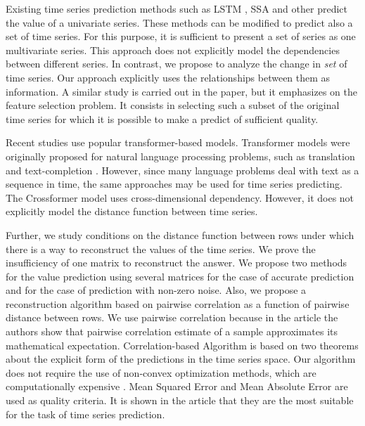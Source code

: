 \documentclass[12pt]{article}
\begin{document}
	Existing time series prediction methods such as LSTM \cite{LSTM}, SSA \cite{SSA} and other \cite{Biosignals, boyd2017multiperiod} predict the value of a univariate series. These methods can be modified to predict also a set of time series. For this purpose, it is sufficient to present a set of series as one multivariate series. This approach does not explicitly model the dependencies between different series. In contrast, we propose to analyze the change in \emph{set} of time series. Our approach explicitly uses the relationships between them as information. A similar study is carried out in the \cite{MulticorrelatedQuadratic} paper, but it emphasizes on the feature selection problem. It consists in selecting such a subset of the original time series for which it is possible to make a predict of sufficient quality.
	
	Recent studies \cite{haoyietal-informer-2021,haoyietal-informerEx-2023,wu2021autoformer,liu2022pyraformer} use popular transformer-based models. Transformer models were originally proposed for natural language processing problems, such as translation and text-completion \cite{NIPS2017_3f5ee243}. However, since many language problems deal with text as a sequence in time, the same approaches may be used for time series predicting. The Crossformer model \cite{zhang2023crossformer} uses cross-dimensional dependency.  However, it does not explicitly model the distance function between time series.
	
	Further, we study conditions on the distance function between rows under which there is a way to reconstruct the values of the time series. We prove the insufficiency of one matrix to reconstruct the answer. We propose two methods for the value prediction using several matrices for the case of accurate prediction and for the case of prediction with non-zero noise. Also, we propose a reconstruction algorithm based on pairwise correlation as a function of pairwise distance between rows. We use pairwise correlation because in the article \cite{puchkin2023sharper} the authors show that pairwise correlation estimate of a sample approximates its mathematical expectation. Correlation-based Algorithm is based on two theorems about the explicit form of the predictions in the time series space. Our algorithm does not require the use of non-convex optimization methods, which are computationally expensive \cite{mikhalevich2024methodsnonconvexoptimization}. Mean Squared Error and Mean Absolute Error are used as quality criteria. It is shown in the article \cite{jadon2022comprehensive} that they are the most suitable for the task of time series prediction.
	
\end{document}
